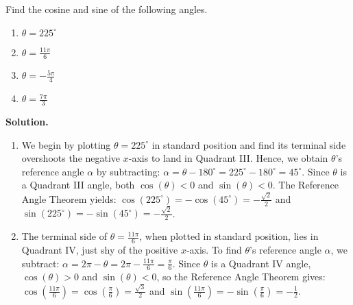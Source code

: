 \begin{ex} \label{refangleex}  Find the cosine and sine of the following angles.

\begin{multicols}{4}

\begin{enumerate}

\item  $\theta = 225^{\circ}$

\item  $\theta = \frac{11 \pi}{6}$

\item  $\theta = -\frac{5 \pi}{4}$

\item  $\theta = \frac{7 \pi}{3}$


\end{enumerate}

\end{multicols}


{\bf Solution.}

\begin{enumerate}

\item  We begin by plotting $\theta = 225^{\circ}$ in standard position and find its terminal side overshoots the negative $x$-axis to land in Quadrant III.  Hence, we obtain $\theta$'s reference angle $\alpha$ by subtracting: $\alpha = \theta - 180^{\circ} = 225^{\circ} - 180^{\circ} = 45^{\circ}$.  Since $\theta$ is a Quadrant III angle, both $\cos(\theta) < 0$ and $\sin(\theta) < 0$.  The Reference Angle Theorem yields: $\cos\left(225^{\circ}\right) = -\cos\left(45^{\circ}\right) = -\frac{\sqrt{2}}{2}$ and $\sin\left(225^{\circ}\right) = - \sin\left(45^{\circ}\right) = -\frac{\sqrt{2}}{2}$.

\item The terminal side of  $\theta = \frac{11\pi}{6}$, when plotted in standard position, lies in Quadrant IV, just shy of the positive $x$-axis.  To find $\theta$'s reference angle $\alpha$, we subtract:  $\alpha = 2\pi - \theta = 2\pi - \frac{11 \pi}{6} = \frac{\pi}{6}$.  Since $\theta$ is a Quadrant IV angle, $\cos(\theta) > 0$ and $\sin(\theta) < 0$, so the Reference Angle Theorem gives: $\cos\left(\frac{11 \pi}{6} \right) = \cos\left(\frac{\pi}{6} \right) = \frac{\sqrt{3}}{2}$ and $\sin\left(\frac{11\pi}{6}\right) = -\sin\left(\frac{\pi}{6}\right) =  -\frac{1}{2}$.

\begin{tabular}{cc}


\end{tabular}
\end{enumerate}
\end{ex}
